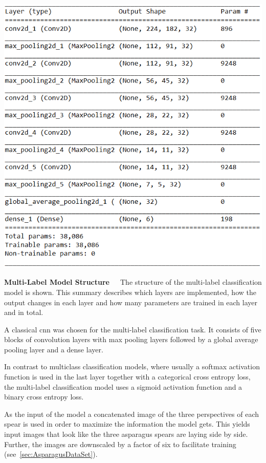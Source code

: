 \begin{table}[!htb]
	\centering
	\includegraphics[scale=0.8]{Figures/chapter04/multilabel_structure.png}
	\decoRule
	\caption[Multi-Label Model Structure]{\textbf{Multi-Label Model Structure}~~~The structure of the multi-label classification model is shown. This summary describes which layers are implemented, how the output changes in each layer and how many parameters are trained in each layer and in total.}
	\label{tab:MultilabelStructure}
\end{table}

\bigskip
A classical \acrshort{cnn} was chosen for the multi-label classification task. It consists of five blocks of convolution layers with max pooling layers followed by a global average pooling layer and a dense layer.

In contrast to multiclass classification models, where usually a softmax activation function is used in the last layer together with a categorical cross entropy loss, the multi-label classification model uses a sigmoid activation function and a binary cross entropy loss.

As the input of the model a concatenated image of the three perspectives of each spear is used in order to maximize the information the model gets. This yields input images that look like the three asparagus spears are laying side by side. Further, the images are downscaled by a factor of six to facilitate training (see~\autoref{sec:AsparagusDataSet}).

